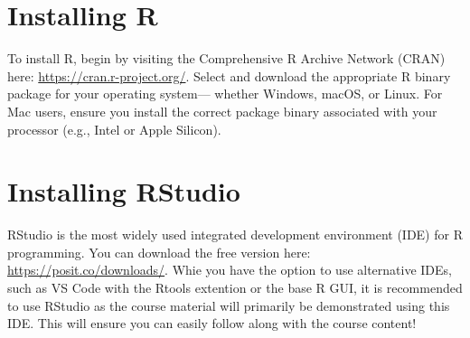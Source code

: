 \documentclass[
]{book}
\begin{document}
\hypertarget{installing-r-1}{%
\section*{Installing R}\label{installing-r-1}}

To install R, begin by visiting the Comprehensive R Archive Network (CRAN) here: \url{https://cran.r-project.org/}. Select and download the appropriate R binary package for your operating system--- whether Windows, macOS, or Linux. For Mac users, ensure you install the correct package binary associated with your processor (e.g., Intel or Apple Silicon).

\hypertarget{installing-rstudio-1}{%
\section*{Installing RStudio}\label{installing-rstudio-1}}

RStudio is the most widely used integrated development environment (IDE) for R programming. You can download the free version here: \url{https://posit.co/downloads/}. Whie you have the option to use alternative IDEs, such as VS Code with the Rtools extention or the base R GUI, it is recommended to use RStudio as the course material will primarily be demonstrated using this IDE. This will ensure you can easily follow along with the course content!

  
\end{document}
